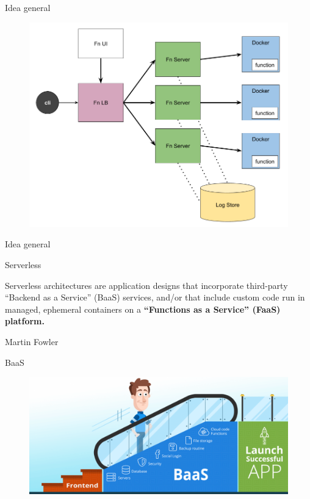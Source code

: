 \documentclass[aspectratio=169]{beamer}
\begin{document}
\begin{frame}{Idea general}
\begin{figure}
	\centering
	\includegraphics[width=0.7\linewidth]{Images/fn-architecture.png}
	\label{fig:architecture}
\end{figure}
\end{frame}



\begin{frame}{Idea general}
\begin{exampleblock}{Serverless}

Serverless architectures are application designs that incorporate third-party “Backend as a Service” (BaaS) services, and/or that include custom code run in managed, ephemeral containers on a \textbf{“Functions as a Service” (FaaS) platform.}
\end{exampleblock}
Martin Fowler
\end{frame}

\begin{frame}{BaaS}
\begin{figure}
	\centering
	\includegraphics[width=0.9\linewidth]{Images/baas.png}
	\label{fig:baas}
\end{figure}
\end{frame}
\end{document}
